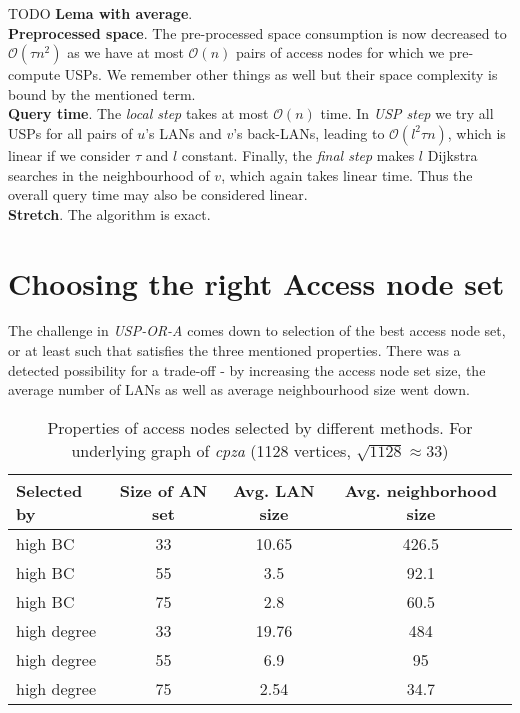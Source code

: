 	TODO \textbf{Lema with average}. \\
	
	\textbf{Preprocessed space}. The pre-processed space consumption is now decreased to $\mathcal{O}(\tau n^{2})$ as we have at most $\mathcal{O}(n)$ pairs of access nodes for which we pre-compute USPs. We remember other things as well but their space complexity is bound by the mentioned term. \\
	
		\textbf{Query time}. The \textit{local step} takes at most $\mathcal{O}(n)$ time. In \textit{USP step} we try all USPs for all pairs of $u$'s LANs and $v$'s back-LANs, leading to $\mathcal{O}(l^{2} \tau n)$, which is linear if we consider $\tau$ and $l$ constant. Finally, the \textit{final step} makes $l$ Dijkstra searches in the neighbourhood of $v$, which again takes linear time. Thus the overall query time may also be considered linear. \\
	
	\textbf{Stretch}. The algorithm is exact. \\
	    
	\section{Choosing the right Access node set}
	
	The challenge in \textit{USP-OR-A} comes down to selection of the best access node set, or at least such that satisfies the three mentioned properties. There was a detected possibility for a trade-off - by increasing the access node set size, the average number of LANs as well as average neighbourhood size went down. \\
	
	\begin{table}[h!]{
		\scriptsize
	    \begin{tabular}{l|c|c|c}
		\hline
			\rowcolor{tablehead}
	           	\textbf{Selected by} & 
	           	\textbf{Size of AN set} &
	           	\textbf{Avg. LAN size} &
	           	\textbf{Avg. neighborhood size} \\
	        \hline
			high BC & 33 & 10.65 & 426.5 \\
			high BC & 55 & 3.5 & 92.1 \\
			high BC & 75 & 2.8 & 60.5 \\
			high degree & 33 & 19.76 & 484 \\
			high degree & 55 & 6.9 & 95 \\
			high degree & 75 & 2.54 & 34.7 \\
	        \end{tabular}}
		\caption{\label{tab:accnodesza} Properties of access nodes selected by different methods. For underlying graph of \textit{cpza} (1128 vertices, $\sqrt{1128} \approx 33$)}
	        \normalsize
	\end{table}
	
